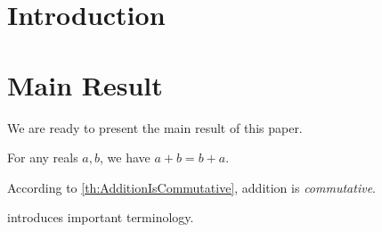 \documentclass{CustomArticle}
\begin{document}
  \PrintTitleAndAbstract


  \section{Introduction}

  \lipsum[1]


  \section{Main Result}

  We are ready to present the main result of this paper.

  \begin{theorem}\label{th:AdditionIsCommutative}
    For any reals $a, b$, we have $a + b = b + a$.
  \end{theorem}

  \begin{remark}\label{th:Terminology}
    According to \cref{th:AdditionIsCommutative}, addition is \emph{commutative}.
  \end{remark}

   introduces important terminology.
\end{document}
